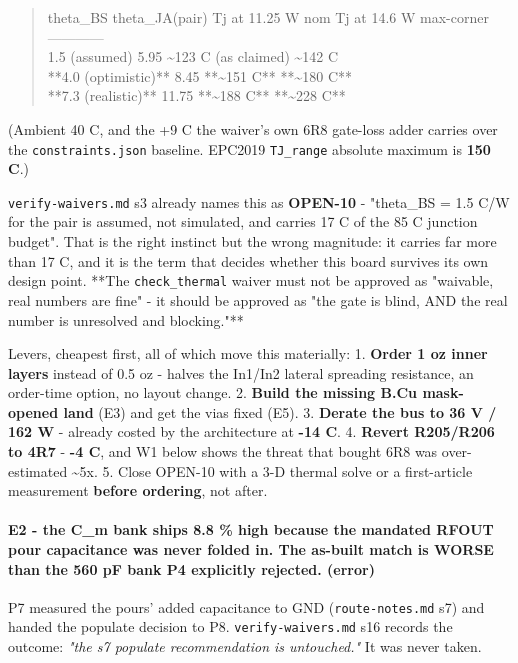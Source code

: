 \documentclass[11pt,a4paper]{article}
\begin{document}
\begin{quote}\small\ttfamily\raggedright
\textbar{} theta\_BS \textbar{} theta\_JA(pair) \textbar{} Tj at 11.25 W nom \textbar{} Tj at 14.6 W max-corner \textbar{}\\
\textbar{}---\textbar{}---\textbar{}---\textbar{}---\textbar{}\\
\textbar{} 1.5 (assumed) \textbar{} 5.95 \textbar{} \textasciitilde{}123 C (as claimed) \textbar{} \textasciitilde{}142 C \textbar{}\\
\textbar{} {*}{*}4.0 (optimistic){*}{*} \textbar{} 8.45 \textbar{} {*}{*}\textasciitilde{}151 C{*}{*} \textbar{} {*}{*}\textasciitilde{}180 C{*}{*} \textbar{}\\
\textbar{} {*}{*}7.3 (realistic){*}{*} \textbar{} 11.75 \textbar{} {*}{*}\textasciitilde{}188 C{*}{*} \textbar{} {*}{*}\textasciitilde{}228 C{*}{*} \textbar{}
\end{quote}
(Ambient 40 C, and the +9 C the waiver's own 6R8 gate-loss adder carries over the \texttt{constraints.json} baseline. EPC2019 \texttt{TJ\_range} absolute maximum is \textbf{150 C}.)

\texttt{verify-waivers.md} s3 already names this as \textbf{OPEN-10} - "theta\_BS = 1.5 C/W for the pair is assumed, not simulated, and carries 17 C of the 85 C junction budget". That is the right instinct but the wrong magnitude: it carries far more than 17 C, and it is the term that decides whether this board survives its own design point. {*}{*}The \texttt{check\_thermal} waiver must not be approved as "waivable, real numbers are fine" - it should be approved as "the gate is blind, AND the real number is unresolved and blocking."{*}{*}

Levers, cheapest first, all of which move this materially: 1. \textbf{Order 1 oz inner layers} instead of 0.5 oz - halves the In1/In2 lateral spreading resistance, an order-time option, no layout change. 2. \textbf{Build the missing B.Cu mask-opened land} (E3) and get the vias fixed (E5). 3. \textbf{Derate the bus to 36 V / 162 W} - already costed by the architecture at \textbf{-14 C}. 4. \textbf{Revert R205/R206 to 4R7} - \textbf{-4 C}, and W1 below shows the threat that bought 6R8 was over-estimated \textasciitilde{}5x. 5. Close OPEN-10 with a 3-D thermal solve or a first-article measurement \textbf{before ordering}, not after.

\paragraph*{E2 - the C\_m bank ships 8.8 \% high because the mandated RFOUT pour capacitance was never folded in. The as-built match is WORSE than the 560 pF bank P4 explicitly rejected. (error)}
P7 measured the pours' added capacitance to GND (\texttt{route-notes.md} s7) and handed the populate decision to P8. \texttt{verify-waivers.md} s16 records the outcome: \emph{"the s7 populate recommendation is untouched."} It was never taken.
\end{document}
